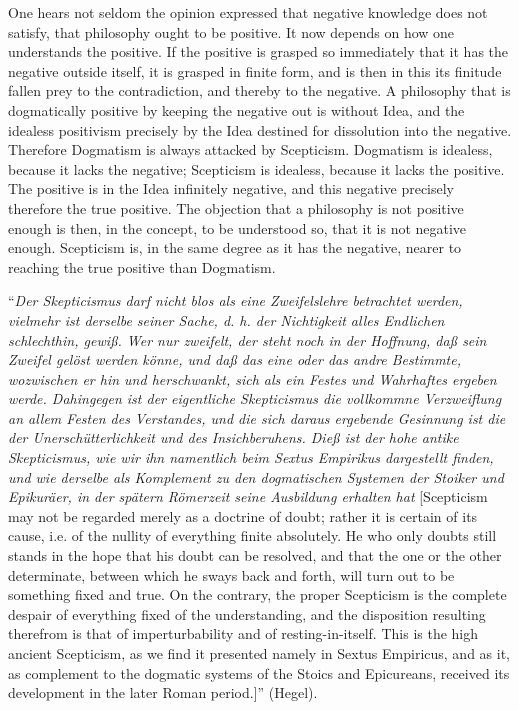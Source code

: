\documentclass[12pt]{book}
\begin{document}
One hears not seldom the opinion expressed that negative knowledge does not satisfy, that philosophy
ought to be positive. It now depends on how one understands the positive. If the positive is grasped
so immediately that it has the negative outside itself, it is grasped in finite form, and is then in
this its finitude fallen prey to the contradiction, and thereby to the negative. A philosophy that is
dogmatically positive by keeping the negative out is without Idea, and the idealess positivism
precisely by the Idea destined for dissolution into the negative. Therefore Dogmatism is always
attacked by Scepticism. Dogmatism is idealess, because it lacks
the negative; Scepticism is idealess, because it lacks the positive. The positive is in the Idea
infinitely negative, and this negative precisely therefore the true positive. The
objection that a philosophy is not positive enough is then, in the concept, to be understood so, that
it is not negative enough. Scepticism is, in the same degree as it has the negative, nearer to
reaching the true positive than Dogmatism.

``\textit{Der Skepticismus darf nicht blos als eine Zweifelslehre betrachtet werden, vielmehr ist
derselbe seiner Sache, d. h. der Nichtigkeit alles Endlichen schlechthin, gewiß. Wer nur zweifelt, der
steht noch in der Hoffnung, daß sein Zweifel gelöst werden könne, und daß das eine oder das andre
Bestimmte, wozwischen er hin und herschwankt, sich als ein Festes und Wahrhaftes ergeben werde.
Dahingegen ist der eigentliche Skepticismus die vollkommne Verzweiflung an allem Festen des
Verstandes, und die sich daraus ergebende Gesinnung ist die der Unerschütterlichkeit und des
Insichberuhens. Dieß ist der hohe antike Skepticismus, wie wir ihn namentlich beim Sextus Empirikus
dargestellt finden, und wie derselbe als Komplement zu den dogmatischen Systemen der Stoiker und
Epikuräer, in der spätern Römerzeit seine Ausbildung erhalten hat} [Scepticism may not be regarded
merely as a doctrine of doubt; rather it is certain of its cause, i.e. of the nullity of everything
finite absolutely. He who only doubts still stands in the hope that his doubt can be resolved, and that
the one or the other determinate, between which he sways back and forth, will turn out to be something
fixed and true. On the contrary, the proper Scepticism is the complete despair of everything fixed of
the understanding, and the disposition resulting therefrom is that of imperturbability and of
resting-in-itself. This is the high ancient Scepticism, as we find it presented namely in Sextus
Empiricus, and as it, as complement to the dogmatic systems of the Stoics and Epicureans, received its
development in the later Roman period.]'' (Hegel).
\end{document}
